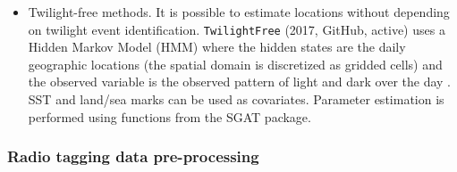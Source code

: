 \documentclass[a4paper,12pt]{article}
\newcommand{\Rpkg}[1]{\texttt{#1}}
\begin{document}
\begin{itemize}
	\item Twilight-free methods. It is possible to estimate locations without depending on twilight event identification. %
	\Rpkg{TwilightFree} (2017, GitHub, active) uses a Hidden Markov Model (HMM) where the hidden states are the daily geographic locations (the spatial domain is discretized as gridded cells) and the observed variable is the observed pattern of light and dark over the day \citep{Bindoff2017}. SST and land/sea marks can be used as covariates. Parameter estimation is performed using functions from the SGAT package. %
\end{itemize}


\subsubsection*{Radio tagging data pre-processing}
\end{document}
